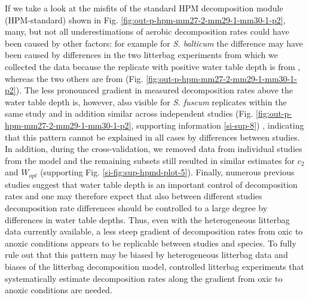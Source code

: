 \documentclass[esd, manuscript]{copernicus}
\begin{document}
If we take a look at the misfits of the standard HPM decomposition module (HPM-standard) shown in Fig. \ref{fig:out-p-hpm-mm27-2-mm29-1-mm30-1-p2}, many, but not all underestimations of aerobic decomposition rates could have been caused by other factors: for example for \emph{S. balticum} the difference may have been caused by differences in the two litterbag experiments from which we collected the data because the replicate with positive water table depth is from \citet{Strakova.2010}, whereas the two others are from \citet{Makila.2018} (Fig. \ref{fig:out-p-hpm-mm27-2-mm29-1-mm30-1-p2}). The less pronounced gradient in measured decomposition rates above the water table depth is, however, also visible for \emph{S. fuscum} replicates within the same study and in addition similar across independent studies (Fig. \ref{fig:out-p-hpm-mm27-2-mm29-1-mm30-1-p2}, supporting information \ref{si-sup-8}) \citep{Johnson.1991, Golovatskaya.2017, Makila.2018}, indicating that this pattern cannot be explained in all cases by differences between studies. In addition, during the cross-validation, we removed data from individual studies from the model and the remaining subsets still resulted in similar estimates for \(c_2\) and \(W_{opt}\) (supporting Fig. \ref{si-fig:sup-hpmd-plot-5}). Finally, numerous previous studies suggest that water table depth is an important control of decomposition rates \citep[e.g.,][]{Blodau.2004} and one may therefore expect that also between different studies decomposition rate differences should be controlled to a large degree by differences in water table depths. Thus, even with the heterogeneous litterbag data currently available, a less steep gradient of decomposition rates from oxic to anoxic conditions appears to be replicable between studies and species. To fully rule out that this pattern may be biased by heterogeneous litterbag data and biases of the litterbag decomposition model, controlled litterbag experiments that systematically estimate decomposition rates along the gradient from oxic to anoxic conditions are needed.
\end{document}
